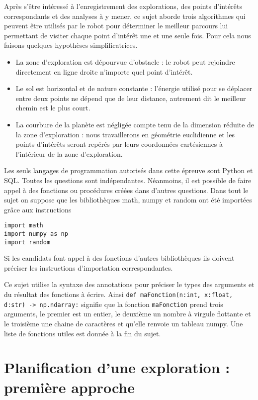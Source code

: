 Après s’être intéressé à l’enregistrement des explorations, des points d’intérêts correspondants et des analyses
à y mener, ce sujet aborde trois algorithmes qui peuvent être utilisés par le robot pour déterminer le meilleur
parcours lui permettant de visiter chaque point d’intérêt une et une seule fois. Pour cela nous faisons quelques
hypothèses simplificatrices.
\begin{itemize}
\item La zone d’exploration est dépourvue d’obstacle : le robot peut rejoindre directement en ligne droite n’importe
quel point d’intérêt.
\item Le sol est horizontal et de nature constante : l’énergie utilisé pour se déplacer entre deux points ne dépend
que de leur distance, autrement dit le meilleur chemin est le plus court.
\item La courbure de la planète est négligée compte tenu de la dimension réduite de la zone d’exploration : nous
travaillerons en géométrie euclidienne et les points d’intérêts seront repérés par leurs coordonnées cartésiennes
à l’intérieur de la zone d’exploration.
\end{itemize}

Les seuls langages de programmation autorisés dans cette épreuve sont Python et SQL. 
Toutes les questions
sont indépendantes. Néanmoins, il est possible de faire appel à des fonctions ou procédures créées dans d’autres
questions. Dans tout le sujet on suppose que les bibliothèques math, numpy et random ont été importées grâce
aux instructions
\begin{lstlisting}
import math
import numpy as np
import random
\end{lstlisting}
 Si les candidats font appel à des fonctions d’autres bibliothèques ils doivent préciser les instructions d’importation
 correspondantes.

Ce sujet utilise la syntaxe des annotations pour préciser le types des arguments et du résultat des fonctions à
écrire. Ainsi
\texttt{def maFonction(n:int, x:float, d:str) -> np.ndarray:}
signifie que la fonction \texttt{maFonction} prend trois arguments, le premier est un entier, le deuxième un nombre à
virgule flottante et le troisième une chaine de caractères et qu’elle renvoie un tableau numpy.
Une liste de fonctions utiles est donnée à la fin du sujet.


\section{Planification d’une exploration : première approche}


